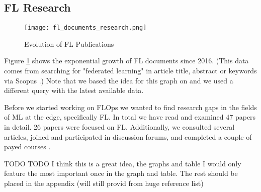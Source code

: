 %
%
%
\subsection{FL Research}\label{subsection:fl_research}

\begin{figure}[h]
    \centering
    \texttt{[image: fl\_documents\_research.png]}
    \caption{Evolution of FL Publications}
    \label{fig:fl_documents_research}
\end{figure}

Figure \ref{fig:fl_documents_research} shows the exponential growth of FL documents
since 2016. (This data comes from searching for "federated learning" in article title, abstract or keywords via Scopus \cite{scopus_homepage}.)
Note that we based the idea for this graph on \cite{thesis:tum_fl_framework_comparison}
and we used a different query with the latest available data.

Before we started working on FLOps we wanted to find research gaps in the fields of 
ML at the edge, specifically FL.
In total we have read and examined 47 papers in detail. 
26 papers were focused on FL. 
Additionally, we consulted several articles,
joined and participated in discussion forums,
and completed a couple of payed courses \cite{udemy_homepage}.

TODO TODO 
I think this is a great idea, the graphs and table
I would only feature the most important once in the graph and table.
The rest should be placed in the appendix (will still provid from huge reference list)

